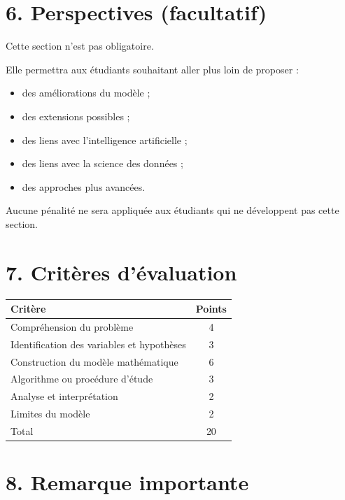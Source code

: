 \documentclass[12pt,a4paper]{article}
\begin{document}
\vspace{0.3cm}

\section*{6. Perspectives (facultatif)}

Cette section n'est pas obligatoire.

Elle permettra aux étudiants souhaitant aller plus loin de proposer :

\begin{itemize}
\item des améliorations du modèle ;
\item des extensions possibles ;
\item des liens avec l'intelligence artificielle ;
\item des liens avec la science des données ;
\item des approches plus avancées.
\end{itemize}

Aucune pénalité ne sera appliquée aux étudiants qui ne développent pas cette section.

\vspace{0.3cm}

\section*{7. Critères d'évaluation}

\begin{center}
\begin{tabular}{|l|c|}
\hline
Critère & Points \\
\hline
Compréhension du problème & 4 \\
Identification des variables et hypothèses & 3 \\
Construction du modèle mathématique & 6 \\
Algorithme ou procédure d'étude & 3 \\
Analyse et interprétation & 2 \\
Limites du modèle & 2 \\
\hline
Total & 20 \\
\hline
\end{tabular}
\end{center}

\vspace{0.3cm}

\section*{8. Remarque importante}
\end{document}
